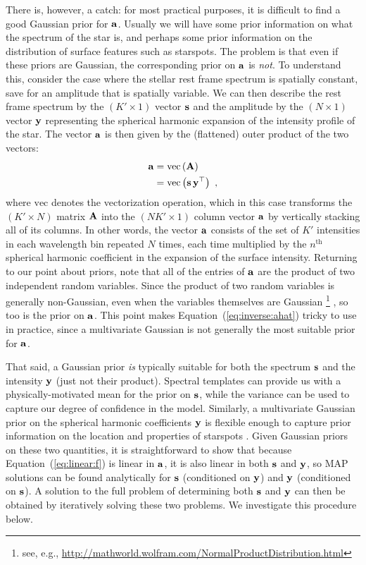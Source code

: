 \documentclass[modern]{aastex631}
\begin{document}
There is, however, a catch: for most practical purposes, it is difficult to find a good Gaussian prior for ${\mathbf{a}}$. 
Usually we will have some prior information on what the spectrum of the star is, and perhaps some prior information on the distribution of surface features such as starspots. 
The problem is that even if these priors are Gaussian, the corresponding prior on ${\mathbf{a}}$ is \emph{not}. 
To understand this, consider the case where the stellar rest frame spectrum is spatially constant, save for an amplitude that is spatially variable. 
We can then describe the rest frame spectrum by the $(K' \times 1)$ vector ${\mathbf{s}}$ and the amplitude by the $(N \times 1)$ vector ${\mathbf{y}}$ representing the spherical harmonic expansion of the intensity profile of the star. 
The vector ${\mathbf{a}}$ is then given by the (flattened) outer product of the two vectors:
%
\begin{align}
    \label{eq:inverse:alm}
    {\ensuremath{\mathbf{a}}} & = \mathrm{vec}\left( {\mathbf{A}} \right) \nonumber             \\
           & = \mathrm{vec}\left( {\mathbf{s}} \, {\mathbf{y}}^\top \right) \hskip 0.33em,
\end{align}
%
where $\mathrm{vec}$ denotes the vectorization operation, which in this case transforms the $(K' \times N)$ matrix ${\mathbf{A}}$ into the $(N K' \times 1)$ column vector ${\mathbf{a}}$ by vertically stacking all of its columns. 
In other words, the vector ${\mathbf{a}}$ consists of the set of $K'$ intensities in each wavelength bin repeated $N$ times, each time multiplied by the $n^\mathrm{th}$ spherical harmonic coefficient in the expansion of the surface intensity. 
Returning to our point about priors, note that all of the entries of ${\mathbf{a}}$ are the product of two independent random variables. 
Since the product of two random variables is generally non-Gaussian, even when the variables themselves are Gaussian%
\footnote{see, e.g., \url{http://mathworld.wolfram.com/NormalProductDistribution.html}}%
, so too is the prior on ${\mathbf{a}}$. 
This point makes Equation~(\ref{eq:inverse:ahat}) tricky to use in practice, since a multivariate Gaussian is not generally the most suitable prior for ${\mathbf{a}}$.

That said, a Gaussian prior \emph{is} typically suitable for both the spectrum ${\mathbf{s}}$ and the intensity ${\mathbf{y}}$ (just not their product). 
Spectral templates can provide us with a physically-motivated mean for the prior on ${\mathbf{s}}$, while the variance can be used to capture our degree of confidence in the model. Similarly, a multivariate Gaussian prior on the spherical harmonic coefficients ${\mathbf{y}}$ is flexible enough to capture prior information on the location and properties of starspots \citep{Luger2021b}.
%
Given Gaussian priors on these two quantities,
it is straightforward to show that because Equation~(\ref{eq:linear:f}) is linear in ${\mathbf{a}}$, it is also linear in both ${\mathbf{s}}$ and ${\mathbf{y}}$, so MAP solutions can be found analytically for ${\mathbf{s}}$ (conditioned on ${\mathbf{y}}$) and ${\mathbf{y}}$ (conditioned on ${\mathbf{s}}$). A solution to the full problem of determining both ${\mathbf{s}}$ and ${\mathbf{y}}$ can then be obtained by iteratively solving these two problems. We investigate this procedure below.
\end{document}

